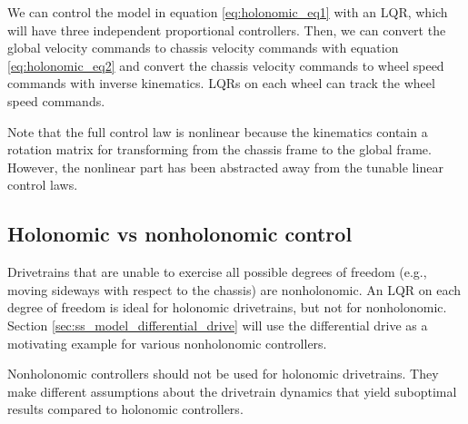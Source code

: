 We can control the model in equation \eqref{eq:holonomic_eq1} with an LQR, which
will have three independent proportional controllers. Then, we can convert the
global velocity commands to chassis velocity commands with equation
\eqref{eq:holonomic_eq2} and convert the chassis velocity commands to wheel
speed commands with inverse kinematics. LQRs on each wheel can track the wheel
speed commands.

Note that the full control law is nonlinear because the kinematics contain a
rotation matrix for transforming from the chassis frame to the global frame.
However, the nonlinear part has been abstracted away from the tunable linear
control laws.

\subsection{Holonomic vs nonholonomic control}

Drivetrains that are unable to exercise all possible degrees of freedom (e.g.,
moving sideways with respect to the chassis) are nonholonomic. An LQR on each
degree of freedom is ideal for holonomic drivetrains, but not for nonholonomic.
Section \ref{sec:ss_model_differential_drive} will use the differential drive as
a motivating example for various nonholonomic controllers.
\begin{remark}
  Nonholonomic controllers should not be used for holonomic drivetrains. They
  make different assumptions about the drivetrain dynamics that yield suboptimal
  results compared to holonomic controllers.
\end{remark}
